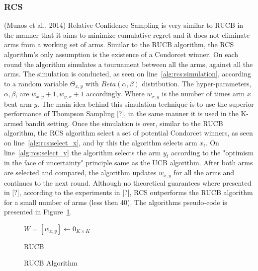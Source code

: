 \documentclass{llncs}
\begin{document}
	\newpage
\subsubsection{RCS}
	(Munos et al., 2014) Relative Confidence Sampling is very similar to RUCB in the manner that it aims to minimize cumulative regret and it does not eliminate arms from a working set of arms.
	Similar to the RUCB algorithm, the RCS algorithm's only assumption is the existence of a Condorcet winner.
	On each round the algorithm simulates a tournament between all the arms, against all the arms. 
	The simulation is conducted, as seen on line~\ref{alg:rcs:simulation}, according to a random variable $\Theta_{x,y} $	with $Beta(\alpha,\beta)$ distribution. 
	The hyper-parameters, $\alpha,\beta$, are $w_{x,y}+1,w_{y,x}+1$ accordingly. Where $w_{x,y}$ is the number of times arm $x$ beat arm $y$.
	The main idea behind this simulation technique is to use the superior performance of Thompson Sampling [?], in the same manner it is used in the K-armed bandit setting. 
	Once the simulation is over, similar to the RUCB algorithm, the RCS algorithm select a set of potential Condorcet winners, as seen on line~\ref{alg:rcs:select_x}, and by this the algorithm selects arm $x_t$.
	On line~\ref{alg:rcs:select_y} the algorithm selects the arm $y_t$ according to the "optimism in the face of uncertainty" principle same as the UCB algorithm.
	After both arms are selected and compared, the algorithm updates $w_{x,y}$ for all the arms and continues to the next round. 
	Although no theoretical guarantees where presented in [?], according to the experiments in [?], RCS outperforms the RUCB algorithm for a small number of arms (less then 40).	
	The algorithms pseudo-code is presented in Figure~\ref{algo_RCS}.
	\begin{figure}[h]
	\IncMargin{1em}
		\begin{algorithm}[H]
		
		$ W = [w_{x,y}]\leftarrow 0_{K \times K} $\\
		\BlankLine
			\caption{RUCB}
		\end{algorithm}
		\caption{RUCB Algorithm}\label{algo_RCS}
	\end{figure}	
	
\end{document}
